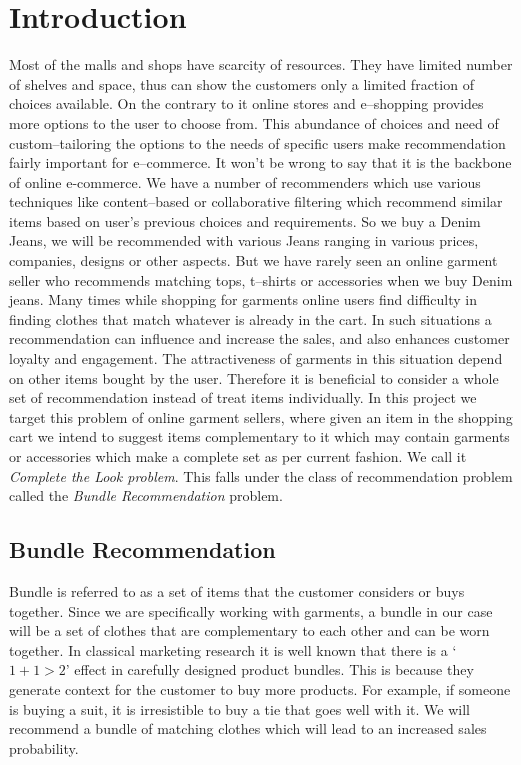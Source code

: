 \chapter{Introduction}

Most of the malls and shops have scarcity of resources. They have limited number of shelves and space, thus can show the 
customers only a limited fraction of choices available. On the contrary to it online stores and e--shopping provides more options to the user to choose from. This abundance of choices and need of custom--tailoring the options to the needs of specific users make recommendation fairly important for e--commerce. It won't be wrong to say that it is the backbone of online e-commerce. We have a number of recommenders which use various techniques like content--based or collaborative filtering which recommend similar items based on user's previous choices and requirements. So we buy a Denim Jeans, we will be recommended with various Jeans ranging in various prices, companies, designs or other aspects. But we have rarely seen an online garment seller who recommends matching tops, t--shirts or accessories when we buy Denim jeans. Many times while shopping for garments online users find difficulty in finding clothes that match whatever is already in the cart. In such situations a recommendation can influence and increase the sales, and also enhances customer loyalty and engagement. The attractiveness of garments in this situation depend on other items bought by the user. Therefore it is beneficial to consider a whole set of recommendation instead of treat items individually. In this project we target this problem of online garment sellers, where given an item in the shopping cart we intend to suggest items complementary to it which may contain garments or accessories which make a complete set as per current fashion. We call it \emph{Complete the Look problem}. This falls under the class of recommendation problem called the \textit{Bundle Recommendation} problem.

\section{Bundle Recommendation}
Bundle is referred to as a set of items that the customer considers or buys together. Since we are specifically working with garments, a bundle in our case will be a set of clothes that are complementary to each other and  can be worn together. In classical marketing research it is well known that there is a `$1+1>2$' effect in carefully designed product bundles\cite{bundleReco}. This is because they generate context for the customer to buy more products. For example, if someone is buying a suit, it is irresistible to buy a tie that goes well with it. We will recommend a bundle of matching clothes which will lead to an increased sales probability.

